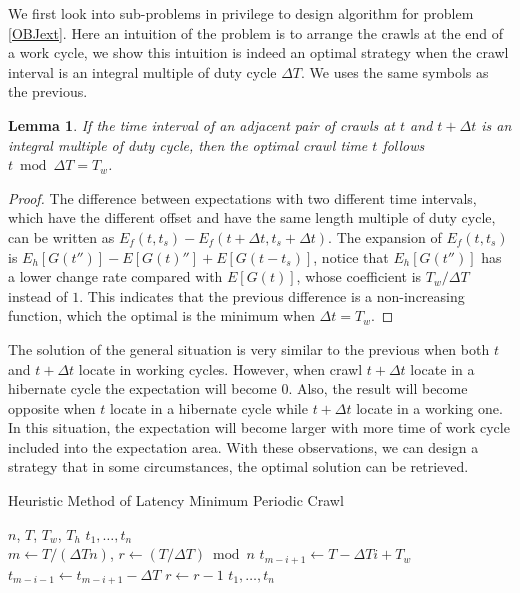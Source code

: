 \documentclass[conference]{IEEEtran}
\newtheorem{lemma}{Lemma}
\begin{document}
We first look into sub-problems in privilege to design algorithm for problem \ref{OBJext}.
Here an intuition of the problem is to arrange the crawls at the end of a work cycle, we show this intuition is indeed an optimal strategy when the crawl interval is an integral multiple of duty cycle $\Delta T$. We uses the same symbols as the previous.

\begin{lemma}
\label{intopt}
If the time interval of an adjacent pair of crawls at $t$ and $t+\Delta t$ is an integral multiple of duty cycle, then the optimal crawl time $t$ follows $t\bmod \Delta T=T_w$.
\end{lemma}

\begin{proof}
The difference between expectations with two different time intervals, which have the different offset and have the same length multiple of duty cycle, can be written as $E_f(t, t_s)-E_f(t+\Delta t, t_s+\Delta t)$. 
The expansion of $E_f(t,t_s)$ is $E_h[G(t'')]-E[G(t)'']+E[G(t-t_s)]$, notice that $E_h[G(t'')]$ has a lower change rate compared with $E[G(t)]$, whose coefficient is $T_w/\Delta T$ instead of $1$. This indicates that the previous difference is a non-increasing function, which the optimal is the minimum when $\Delta t =T_w$.
\end{proof}


The solution of the general situation is very similar to the previous when both $t$ and $t+\Delta t$ locate in working cycles. However, when crawl $t+\Delta t$  locate in a hibernate cycle the expectation will become $0$. Also, the result will become opposite when $t$ locate in a hibernate cycle while $t+\Delta t$ locate in a working one. In this situation, the expectation will become larger with more time of work cycle included into the expectation area. 
With these observations, we can design a strategy that in some circumstances, the optimal solution can be retrieved.

\begin{algorithm}
\caption{Heuristic Method of Latency Minimum Periodic Crawl}
  \begin{algorithmic}[1]
  \renewcommand{\algorithmicrequire}{\textbf{Input:}}
  \renewcommand{\algorithmicensure}{\textbf{Output:}}
  \REQUIRE $n$, $T$, $T_w$, $T_h$
  \ENSURE  $t_1,\ldots,t_n$
  \\ 
  \STATE $m \gets T/(\Delta T n)$, $r\gets (T/\Delta T)\bmod{n}$
    \STATE $t_{m-i+1}\gets T-\Delta T i + T_w$
    	\STATE $t_{m-i-1}\gets t_{m-i+1}-\Delta T$
        \STATE $r\gets r-1$
    \ENDIF
  \ENDFOR
  \RETURN $t_1,\ldots,t_n$
  \end{algorithmic} 
\end{algorithm}
\end{document}
